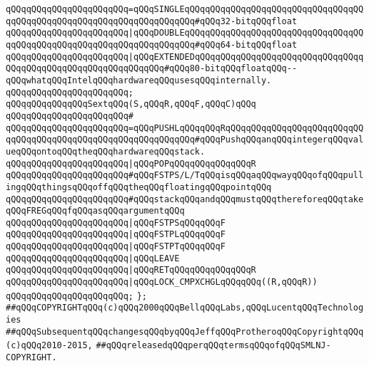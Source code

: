 \verb|qQQqqQQqqQQqqQQqqQQqqQQq=qQQqSINGLEqQQqqQQqqQQqqQQqqQQqqQQqqQQqqQQqqQQqqQQqqQQqqQQqqQQqqQQqqQQqqQQqqQQqqQQq#qQQq32-bitqQQqfloat|\newline
\verb|qQQqqQQqqQQqqQQqqQQqqQQq|\verb#|qQQqDOUBLEqQQqqQQqqQQqqQQqqQQqqQQqqQQqqQQqqQQqqQQqqQQqqQQqqQQqqQQqqQQqqQQqqQQqqQQq#\verb|#qQQq64-bitqQQqfloat|\newline
\verb|qQQqqQQqqQQqqQQqqQQqqQQq|\verb#|qQQqEXTENDEDqQQqqQQqqQQqqQQqqQQqqQQqqQQqqQQqqQQqqQQqqQQqqQQqqQQqqQQqqQQqqQQq#\verb|#qQQq80-bitqQQqfloatqQQq--qQQqwhatqQQqIntelqQQqhardwareqQQqusesqQQqinternally.|\newline
\verb|qQQqqQQqqQQqqQQqqQQqqQQq;|\newline
\newline
\verb|qQQqqQQqqQQqqQQqSextqQQq(S,qQQqR,qQQqF,qQQqC)qQQq|\newline
\verb|qQQqqQQqqQQqqQQqqQQqqQQq#|\newline
\verb|qQQqqQQqqQQqqQQqqQQqqQQq=qQQqPUSHLqQQqqQQqRqQQqqQQqqQQqqQQqqQQqqQQqqQQqqQQqqQQqqQQqqQQqqQQqqQQqqQQqqQQqqQQq#qQQqPushqQQqanqQQqintegerqQQqvalueqQQqontoqQQqtheqQQqhardwareqQQqstack.|\newline
\verb|qQQqqQQqqQQqqQQqqQQqqQQq|\verb#|qQQqPOPqQQqqQQqqQQqqQQqR#\newline
\newline
\verb|qQQqqQQqqQQqqQQqqQQqqQQq#qQQqFSTPS/L/TqQQqisqQQqaqQQqwayqQQqofqQQqpullingqQQqthingsqQQqoffqQQqtheqQQqfloatingqQQqpointqQQq|\newline
\verb|qQQqqQQqqQQqqQQqqQQqqQQq#qQQqstackqQQqandqQQqmustqQQqthereforeqQQqtakeqQQqFREGqQQqfqQQqasqQQqargumentqQQq|\newline
\newline
\verb|qQQqqQQqqQQqqQQqqQQqqQQq|\verb#|qQQqFSTPSqQQqqQQqF#\newline
\verb|qQQqqQQqqQQqqQQqqQQqqQQq|\verb#|qQQqFSTPLqQQqqQQqF#\newline
\verb|qQQqqQQqqQQqqQQqqQQqqQQq|\verb#|qQQqFSTPTqQQqqQQqF#\newline
\newline
\verb|qQQqqQQqqQQqqQQqqQQqqQQq|\verb#|qQQqLEAVE#\newline
\verb|qQQqqQQqqQQqqQQqqQQqqQQq|\verb#|qQQqRETqQQqqQQqqQQqqQQqR#\newline
\newline
\verb|qQQqqQQqqQQqqQQqqQQqqQQq|\verb#|qQQqLOCK_CMPXCHGLqQQqqQQq((R,qQQqR))#\newline
\verb|qQQqqQQqqQQqqQQqqQQqqQQq;|\newline
\newline
\verb|};|\newline
\newline
\newline
\verb|##qQQqCOPYRIGHTqQQq(c)qQQq2000qQQqBellqQQqLabs,qQQqLucentqQQqTechnologies|\newline
\verb|##qQQqSubsequentqQQqchangesqQQqbyqQQqJeffqQQqProtheroqQQqCopyrightqQQq(c)qQQq2010-2015,|\newline
\verb|##qQQqreleasedqQQqperqQQqtermsqQQqofqQQqSMLNJ-COPYRIGHT.|\newline

